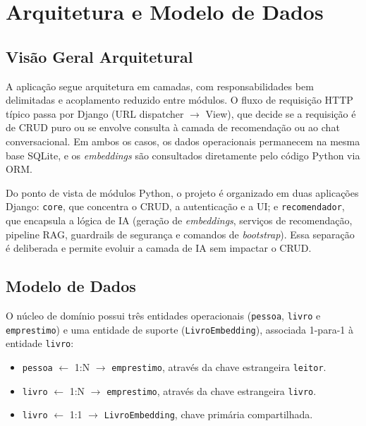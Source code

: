 \documentclass[monografia,abnt]{inf-ufg-modificado}
\begin{document}
\chapter{Arquitetura e Modelo de Dados}

\section{Visão Geral Arquitetural}

A aplicação segue arquitetura em camadas, com responsabilidades bem delimitadas e acoplamento reduzido entre módulos. O fluxo de requisição HTTP típico passa por Django (URL dispatcher $\rightarrow$ View), que decide se a requisição é de CRUD puro ou se envolve consulta à camada de recomendação ou ao chat conversacional. Em ambos os casos, os dados operacionais permanecem na mesma base SQLite, e os \textit{embeddings} são consultados diretamente pelo código Python via ORM.

Do ponto de vista de módulos Python, o projeto é organizado em duas aplicações Django: \texttt{core}, que concentra o CRUD, a autenticação e a UI; e \texttt{recomendador}, que encapsula a lógica de IA (geração de \textit{embeddings}, serviços de recomendação, pipeline RAG, guardrails de segurança e comandos de \textit{bootstrap}). Essa separação é deliberada e permite evoluir a camada de IA sem impactar o CRUD.

\section{Modelo de Dados}
\label{sec:modelo-dados}

O núcleo de domínio possui três entidades operacionais (\texttt{pessoa}, \texttt{livro} e \texttt{emprestimo}) e uma entidade de suporte (\texttt{LivroEmbedding}), associada 1-para-1 à entidade \texttt{livro}:

\begin{itemize}
    \item \texttt{pessoa} $\leftarrow$ 1:N $\rightarrow$ \texttt{emprestimo}, através da chave estrangeira \texttt{leitor}.
    \item \texttt{livro} $\leftarrow$ 1:N $\rightarrow$ \texttt{emprestimo}, através da chave estrangeira \texttt{livro}.
    \item \texttt{livro} $\leftarrow$ 1:1 $\rightarrow$ \texttt{LivroEmbedding}, chave primária compartilhada.
\end{itemize}
\end{document}
